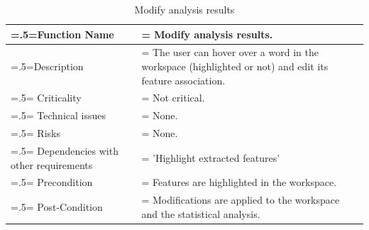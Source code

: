 \documentclass[12pt]{article}
\begin{document}
\begin{center}
    \begin{table}[H]
        \caption{Modify analysis results}
        \begin{tabularx}{\textwidth} {
                | >{\raggedright\arraybackslash\hsize=.5\hsize\linewidth=\hsize}X
                | >{\raggedright\arraybackslash\hsize=1.5\hsize\linewidth=\hsize}X |}
            \hline
            Function Name                        & Modify analysis results.                                                                               \\ \hline
            Description                          & The user can hover over a word in the workspace (highlighted or not) and edit its feature association. \\ \hline
            Criticality                          & Not critical.                                                                                          \\ \hline
            Technical issues                     & None.                                                                                                  \\ \hline
            Risks                                & None.                                                                                                  \\ \hline
            Dependencies with other requirements & 'Highlight extracted features'                                                                         \\ \hline
            Precondition                         & Features are highlighted in the workspace.                                                             \\ \hline
            Post-Condition                       & Modifications are applied to the workspace and the statistical analysis.                               \\ \hline
        \end{tabularx}
    \end{table}
\end{center}
\end{document}
